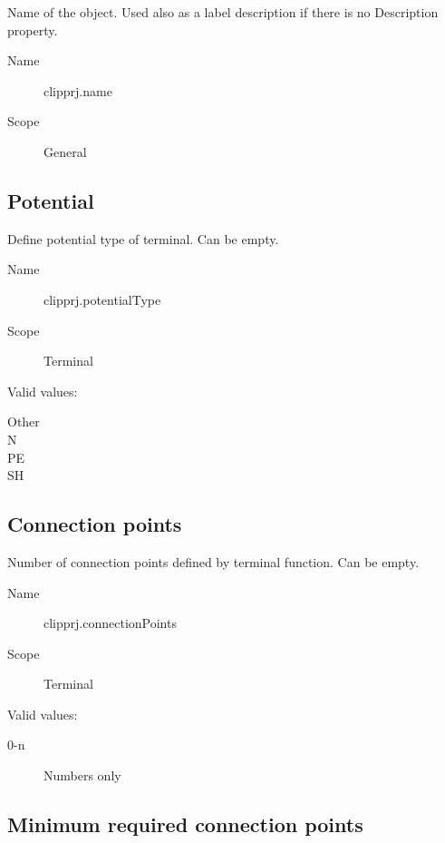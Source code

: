 \documentclass[%
	a4paper,
	oneside,
	listof=numbered,
	parskip=half,
	headsepline=true,
	footsepline=false,
	0.7headlines,
	]{scrbook}
\begin{document}
Name of the object.
Used also as a label description if there is no Description property.

\begin{description}
	\item[Name] clipprj.name
	\item[Scope] General
\end{description}

\subsection{Potential}

Define potential type of terminal.
Can be empty.

\begin{description}
	\item[Name] clipprj.potentialType
	\item[Scope] Terminal
\end{description}

Valid values:

\begin{description}
	\item[Other]
	\item[N]
	\item[PE]
	\item[SH]
\end{description}

\subsection{Connection points}

Number of connection points defined by terminal function.
Can be empty.

\begin{description}
	\item[Name] clipprj.connectionPoints
	\item[Scope] Terminal
\end{description}

Valid values:

\begin{description}
	\item[0-n] Numbers only
\end{description}

\subsection{Minimum required connection points}
\end{document}
